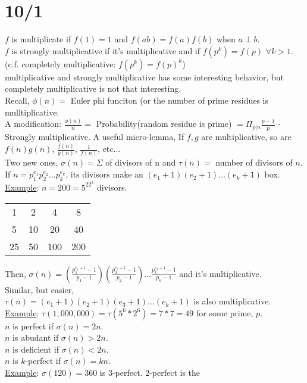 \documentclass[13pt]{article}
\begin{document}
\section*{10/1}
	$f$ is multiplicate if $f(1) = 1$ and $f(ab) = f(a)f(b)$ when $ a\perp b$.\\
	$f$ is strongly multiplicative if it's multiplicative and if $f(p^k) = f(p)$
	$\forall k > 1$. (c.f. completely multiplicative: $f(p^k) = f(p)^k$)\\
	multiplicative and strongly multiplicative has some interesting behavior, but
	completely multiplicative is not that interesting.\\
	Recall, $\phi(n) = $ Euler phi funciton (or the number of prime residues is
	mulltiplicative.\\
	A modification: $\frac{\phi(n)}{n} = $ Probability(random residue is prime)
	$ = \Pi_{p | n }\frac{p - 1}{p}$ - Strongly multiplicative. A useful 
	micro-lemma, If $f, g$ are multiplicative, so are $f(n)g(n)$, $\frac{f(n)}
	{g(n)}$, $\frac{1}{f(n)}$, etc...\\
	Two new ones, $\sigma(n) = \Sigma$ of divisors of n and $\tau(n) = $ number
	of divisors of $n$. If $n = p_1^{e_1} p_2^{e_2} \ldots p_k^{e_k}$, its 
	divisors make an $(e_1 + 1)(e_2+1) \ldots (e_k +1)$ box.\\
	\underline{Example}: $n = 200 = 5^22^3$ divisors. 
	\begin{tabular}{c  c c c }
		1 & 2 & 4 & 8\\
		5 & 10 & 20 & 40 \\
		25 & 50 & 100 & 200\\
	\end{tabular}
	Then, $\sigma(n) = (\frac{p_1^{e_1+ 1} - 1}{p_1 - 1})(\frac{p_2^{e_2+1} - 1}
	{p_2 - 1}) \ldots \frac{p_k^{e_k + 1} - 1}{ p_k - 1}$ and it's multiplicative.
	\\
	Similar, but easier,\\
	$\tau(n) = (e_1 + 1) (e_2 + 1)(e_3 + 1) \ldots (e_k + 1)$ is also 
	multiplicative. \\
	\underline{Example}: $\tau(1,000,000) = \tau(5^6 * 2^6) = 7*7 = 49$ for some
	prime, $p$.\\
	$n$ is perfect if $\sigma(n) = 2n$. \\
	$n$ is abudant if $\sigma(n) > 2n$. \\
	$n$ is deficient if $\sigma(n) < 2n$. \\
	$n$ is $k$-perfect if $\sigma(n) = kn$. \\
	\underline{Example}: $\sigma(120) = 360$ is 3-perfect. 2-perfect is the
\end{document}
